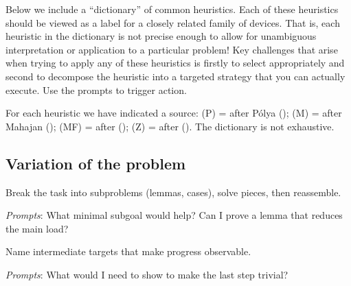 \documentclass[
  a4paper,
  DIV=11,
  numbers=noendperiod,
  oneside]{scrreprt}
\begin{document}
Below we include a ``dictionary'' of common heuristics. Each of these
heuristics should be viewed as a label for a closely related family of
devices. That is, each heuristic in the dictionary is not precise enough
to allow for unambiguous interpretation or application to a particular
problem! Key challenges that arise when trying to apply any of these
heuristics is firstly to select appropriately and second to decompose
the heuristic into a targeted strategy that you can actually execute.
Use the prompts to trigger action.

For each heuristic we have indicated a source: (P) = after Pólya
(); (M) = after Mahajan
(); (MF) = after
();
(Z) = after (). The dictionary is
not exhaustive.

\subsection*{Variation of the problem}\label{variation-of-the-problem}

\begin{tcolorbox}[enhanced jigsaw, toprule=.15mm, left=2mm, colbacktitle=quarto-callout-note-color!10!white, colframe=quarto-callout-note-color-frame, toptitle=1mm, leftrule=.75mm, arc=.35mm, rightrule=.15mm, opacityback=0, coltitle=black, bottomrule=.15mm, title={Decomposing and recombining (P, Z)}, colback=white, titlerule=0mm, bottomtitle=1mm, breakable, opacitybacktitle=0.6]

Break the task into subproblems (lemmas, cases), solve pieces, then
reassemble.

\emph{Prompts}: What minimal subgoal would help? Can I prove a lemma
that reduces the main load?

\end{tcolorbox}

\begin{tcolorbox}[enhanced jigsaw, toprule=.15mm, left=2mm, colbacktitle=quarto-callout-note-color!10!white, colframe=quarto-callout-note-color-frame, toptitle=1mm, leftrule=.75mm, arc=.35mm, rightrule=.15mm, opacityback=0, coltitle=black, bottomrule=.15mm, title={Establishing and using subgoals (P, Z)}, colback=white, titlerule=0mm, bottomtitle=1mm, breakable, opacitybacktitle=0.6]

Name intermediate targets that make progress observable.

\emph{Prompts}: What would I need to show to make the last step trivial?

\end{tcolorbox}
\end{document}
